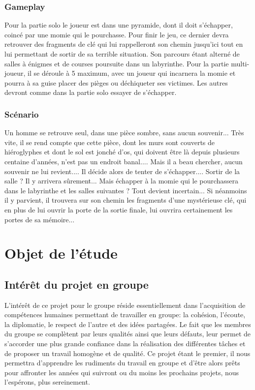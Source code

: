 \documentclass[12pt,a4paper]{article}
\begin{document}
\subsubsection{Gameplay}
Pour la partie solo le joueur est dans une pyramide, dont il doit s'échapper, coincé par une momie qui le pourchasse. Pour finir le jeu, ce dernier devra retrouver des fragments de clé qui lui rappelleront son chemin jusqu'ici tout en lui permettant de sortir de sa terrible situation. Son parcours étant alterné de salles à énigmes et de courses poursuite dans un labyrinthe.
Pour la partie multi-joueur, il se déroule à 5 maximum, avec un joueur qui incarnera la momie et pourra à sa guise placer des pièges ou déchiqueter ses victimes.
Les autres devront comme dans la partie solo essayer de s'échapper.
\subsubsection{Scénario}
Un homme se retrouve seul, dans une pièce sombre, sans aucun souvenir...
Très vite, il se rend compte que cette pièce, dont les murs sont couverts de hiéroglyphes et dont le sol est jonché d'os, qui doivent être là depuis plusieurs centaine d'années, n'est pas un endroit banal....
Mais il a beau chercher, aucun souvenir ne lui revient....
Il décide alors de tenter de s'échapper....
Sortir de la salle ? Il y arrivera sûrement... Mais échapper à la momie qui le pourchassera dans le labyrinthe et les salles suivantes ? Tout devient incertain...
Si néanmoins il y parvient, il trouvera sur son chemin les fragments d'une mystérieuse clé, qui en plus de lui ouvrir la porte de la sortie finale, lui ouvrira certainement les portes de sa mémoire...

\newpage
\section{Objet de l'étude}
\subsection{Intérêt du projet en groupe}
L'intérêt de ce projet pour le groupe réside essentiellement dans l'acquisition de compétences humaines
permettant de travailler en groupe: la cohésion, l'écoute, la diplomatie, le respect de l'autre et des idées partagées.
Le fait que les membres du groupe se complètent par leurs qualités ainsi que leurs défauts, leur permet de s'accorder une plus grande confiance dans la réalisation des différentes tâches et de proposer un travail
homogène et de qualité.
Ce projet étant le premier, il nous permettra d'apprendre les rudiments du travail en groupe et d'être
alors prêts pour affronter les années qui suivront ou du moins les
prochains projets, nous l'espérons, plus sereinement.
\end{document}
